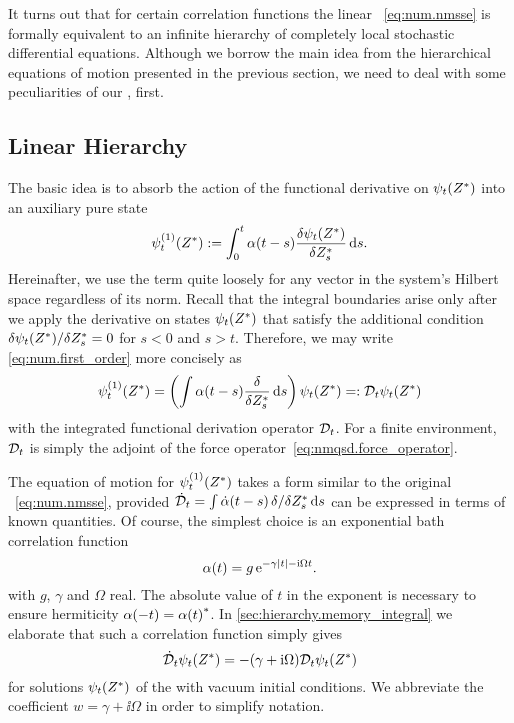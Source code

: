 It turns out that for certain correlation functions the linear \NMSSE~\ref{eq:num.nmsse} is formally equivalent to an infinite hierarchy of completely local stochastic differential equations.
Although we borrow the main idea from the hierarchical equations of motion presented in the previous section, we need to deal with some peculiarities of our \NMSSE, first.

\subsection{Linear Hierarchy}
\label{sub:num.sheom.lin}
%

The basic idea is to absorb the action of the functional derivative on $\psitZ$ into an auxiliary pure state
\begin{equation}
  \psitZ[1] := \int_0^t \alpha(t - s) \frac{\delta \psi_t(\ZZ)}{\delta \ZZ_s} \dd s.
  \label{eq:num.first_order}
\end{equation}
Hereinafter, we use the term  quite loosely for any vector in the system's Hilbert space regardless of its norm.
Recall that the integral boundaries arise only after we apply the derivative on states $\psi_t({Z}^*)$ that satisfy the additional condition $\delta \psitZ / \delta \ZZ_s = 0$ for $ s < 0$ and $s > t$.
Therefore, we may write \autoref{eq:num.first_order} more concisely as
\begin{equation*}
  \psitZ[1] = \left( \int \alpha(t - s) \frac{\delta}{\delta \ZZ_s} \dd s \right) \psitZ =: \adjZZ_t \psitZ
\end{equation*}
with the integrated functional derivation operator $\mathcal{D}_t$.
For a finite environment, $\mathcal{D}_t$ is simply the adjoint of the force operator~\ref{eq:nmqsd.force_operator}.

The equation of motion for $\psitZ[1]$ takes a form similar to the original \NMSSE~\ref{eq:num.nmsse}, provided $\dot{\mathcal{D}}_t = \int\dot\alpha(t-s) \, \delta / \delta {Z}^*_s \, \mathrm{d} s$ can be expressed in terms of known quantities.
Of course, the simplest choice is an exponential bath correlation function
\begin{equation}
  \alpha(t) = g \, \exp[-\gamma \abs{t} - \ii \Omega t].
  \label{eq:num.exp_bcf}
\end{equation}
with $g$, $\gamma$ and $\Omega$ real.
The absolute value of $t$ in the exponent is necessary to ensure hermiticity $\alpha(-t) = {\alpha(t)}^*$.
In \autoref{sec:hierarchy.memory_integral} we elaborate that such a correlation function simply gives
\begin{equation}
  \dot\adjZZ_t \psitZ = - (\gamma + \ii \Omega) \adjZZ_t\psitZ
  \label{eq:num.dot_adjZZt}
\end{equation}
for solutions $\psitZ$ of the \NMSSE with vacuum initial conditions.
We abbreviate the coefficient $w = \gamma + \ii\Omega$ in order to simplify notation.\\



